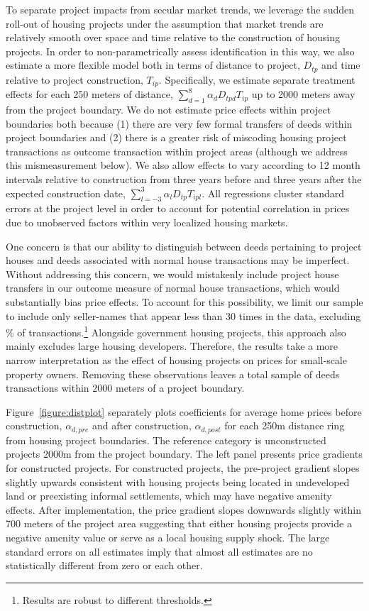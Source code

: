 \documentclass[12pt]{article}
\begin{document}
To separate project impacts from secular market trends, we leverage the sudden roll-out of housing projects under the assumption that market trends are relatively smooth over space and time relative to the construction of housing projects.  In order to non-parametrically assess identification in this way, we also estimate a more flexible model both in terms of distance to project, $D_{tp}$ and time relative to project construction, $T_{ip}$.  Specifically, we estimate separate treatment effects for each 250 meters of distance, $\sum_{d=1}^{8} \alpha_d D_{tpd} T_{ip}$ up to 2000 meters away from the project boundary.  We do not estimate price effects within project boundaries both because (1) there are very few formal transfers of deeds within project boundaries and (2) there is a greater risk of miscoding housing project transactions as outcome transaction within project areas (although we address this mismeasurement below).  We also allow effects to vary according to 12 month intervals relative to construction from three years before and three years after the expected construction date, $\sum_{l=-3}^{3} \alpha_l D_{tp}T_{ipl}$.  All regressions cluster standard errors at the project level in order to account for potential correlation in prices due to unobserved factors within very localized housing markets.  

One concern is that our ability to distinguish between deeds pertaining to project houses and deeds associated with normal house transactions may be imperfect.  Without addressing this concern, we would mistakenly include project house transfers in our outcome measure of normal house transactions, which would substantially bias price effects.  To account for this possibility, we limit our sample to include only seller-names that appear less than 30 times in the data, excluding \unskip\% of transactions.\footnote{Results are robust to different thresholds.}  Alongside government housing projects, this approach also mainly excludes large housing developers.  Therefore, the results take a more narrow interpretation as the effect of housing projects on prices for small-scale property owners.  Removing these observations leaves a total sample of deeds transactions within 2000 meters of a project boundary.

Figure~\ref{figure:distplot} separately plots coefficients for average home prices before construction, $\alpha_{d,pre}$ and after construction, $\alpha_{d,post}$ for each 250m distance ring from housing project boundaries.  The reference category is unconstructed projects 2000m from the project boundary.  The left panel presents price gradients for constructed projects.  For constructed projects, the pre-project gradient slopes slightly upwards consistent with housing projects being located in undeveloped land or preexisting informal settlements, which may have negative amenity effects.  After implementation, the price gradient slopes downwards slightly within 700 meters of the project area suggesting that either housing projects provide a negative amenity value or serve as a local housing supply shock.  The large standard errors on all estimates imply that almost all estimates are no statistically different from zero or each other.
\end{document}
